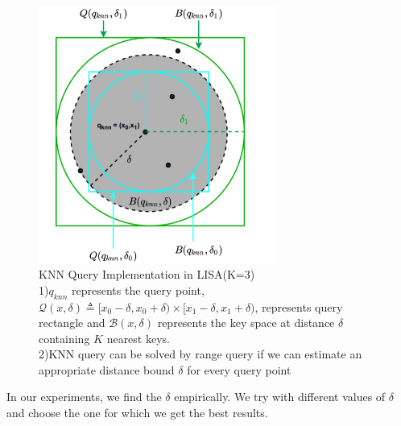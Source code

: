 \begin{figure}[t]
    \centering
    \includegraphics[width=0.7\textwidth]{graphs/KNN_Query_LISA.png}
    \caption{KNN Query Implementation in LISA(K=3)\\
    1)$q_{knn}$ represents the query point, $ \mathcal{Q}(x,\delta) \triangleq [x_{0}-\delta, x_{0}+\delta) \times[x_{1}-\delta, x_{1}+\delta)$, represents query rectangle and $ \mathcal{B}(x, \delta)$ represents the key space at distance $\delta$ containing $K$ nearest keys.\\
    2)KNN query can be solved by range query if we can estimate an appropriate distance bound $\delta$ for every query point\\
    }
    \label{fig:KNN_Query_LISA}
\end{figure}
In our experiments, we find the $\delta$ empirically. We try with different values of $\delta$ and choose the one for which we get the best results. 